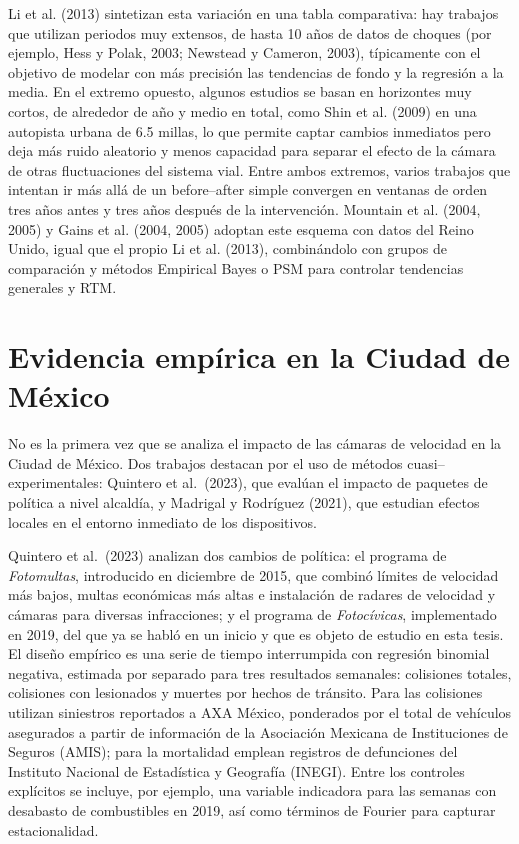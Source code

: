\indent  Li et al. (2013) sintetizan esta variación en una tabla comparativa: hay trabajos que utilizan periodos muy extensos, de hasta 10 años de datos de choques (por ejemplo, Hess y Polak, 2003; Newstead y Cameron, 2003), típicamente con el objetivo de modelar con más precisión las tendencias de fondo y la regresión a la media. En el extremo opuesto, algunos estudios se basan en horizontes muy cortos, de alrededor de año y medio en total, como Shin et al. (2009) en una autopista urbana de 6.5 millas, lo que permite captar cambios inmediatos pero deja más ruido aleatorio y menos capacidad para separar el efecto de la cámara de otras fluctuaciones del sistema vial. Entre ambos extremos, varios trabajos que intentan ir más allá de un before–after simple convergen en ventanas de orden tres años antes y tres años después de la intervención. Mountain et al. (2004, 2005) y Gains et al. (2004, 2005) adoptan este esquema con datos del Reino Unido, igual que el propio Li et al. (2013), combinándolo con grupos de comparación y métodos Empirical Bayes o PSM para controlar tendencias generales y RTM. 

\section{Evidencia empírica en la Ciudad de México}

\noindent No es la primera vez que se analiza el impacto de las cámaras de velocidad en la Ciudad de México. Dos trabajos destacan por el uso de métodos cuasi–experimentales: Quintero et al.\ (2023), que evalúan el impacto de paquetes de política a nivel alcaldía, y Madrigal y Rodríguez (2021), que estudian efectos locales en el entorno inmediato de los dispositivos.

Quintero et al.\ (2023) analizan dos cambios de política: el programa de \emph{Fotomultas}, introducido en diciembre de 2015, que combinó límites de velocidad más bajos, multas económicas más altas e instalación de radares de velocidad y cámaras para diversas infracciones; y el programa de \emph{Fotoc\'ivicas}, implementado en 2019, del que ya se habló en un inicio y que es objeto de estudio en esta tesis. El diseño empírico es una serie de tiempo interrumpida con regresión binomial negativa, estimada por separado para tres resultados semanales: colisiones totales, colisiones con lesionados y muertes por hechos de tránsito. Para las colisiones utilizan siniestros reportados a AXA México, ponderados por el total de vehículos asegurados a partir de información de la Asociación Mexicana de Instituciones de Seguros (AMIS); para la mortalidad emplean registros de defunciones del Instituto Nacional de Estadística y Geografía (INEGI). Entre los controles explícitos se incluye, por ejemplo, una variable indicadora para las semanas con desabasto de combustibles en 2019, así como términos de Fourier para capturar estacionalidad.\\


